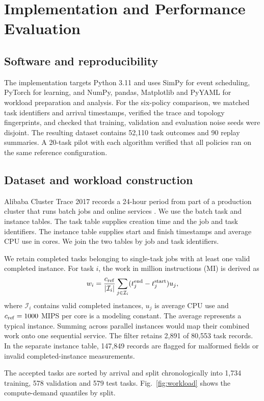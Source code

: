 \section{Implementation and Performance Evaluation}
\subsection{Software and reproducibility}
The implementation targets Python 3.11 and uses SimPy for event scheduling, PyTorch for learning, and
NumPy, pandas, Matplotlib and PyYAML for workload preparation and analysis.
For the six-policy comparison, we matched task identifiers and arrival
timestamps, verified the trace and topology fingerprints, and checked
that training, validation and evaluation noise seeds were disjoint.
The resulting dataset contains 52,110 task outcomes and 90 replay
summaries. A 20-task pilot with each algorithm verified that all
policies ran on the same reference configuration.

\subsection{Dataset and workload construction}
Alibaba Cluster Trace 2017 records a 24-hour period from part of a
production cluster that runs batch jobs and online services
\cite{alibaba2017}. We use the batch task and instance tables. The task
table supplies creation time and the job and task identifiers. The
instance table supplies start and finish timestamps and average CPU
use in cores. We join the two tables by job and task identifiers.

We retain completed tasks belonging to single-task jobs with at least
one valid completed instance. For task $i$, the work in million
instructions (MI) is derived as
\begin{equation}
w_i=\frac{c_{\rm ref}}{|\mathcal I_i|}
\sum_{j\in\mathcal I_i}(t^{\rm end}_j-t^{\rm start}_j)u_j,
\end{equation}
where $\mathcal I_i$ contains valid completed instances, $u_j$ is
average CPU use and $c_{\rm ref}=1000$ MIPS per core is a modeling
constant. The average represents a typical instance. Summing across
parallel instances would map their combined work onto one sequential
service. The filter retains 2,891 of 80,553 task records. In the
separate instance table, 147,849 records are flagged for malformed
fields or invalid completed-instance measurements.

The accepted tasks are sorted by arrival and split chronologically
into 1,734 training, 578 validation and 579 test tasks.
Fig.~\ref{fig:workload} shows the compute-demand quantiles by split.

